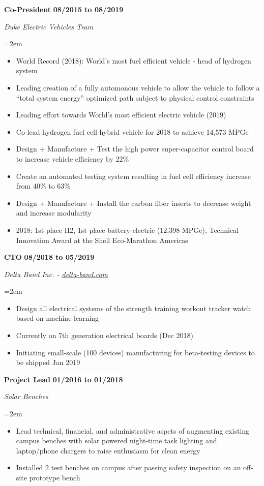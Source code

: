 \documentclass[paper=letter,fontsize=11pt]{scrartcl} %
\newcommand{\sepspace}{\vspace*{1em}}		%
\newcommand{\EducationEntry}[4]{
		\noindent \textbf{#1} \hfill      %
		\colorbox{White}{%
			\bf 
			\parbox{10em}{%
			\hfill\color{Black}#2}} \par  %
		\noindent \textit{#3} \par        %
		\noindent\hangindent=2em\hangafter=0 \small #4 %
		\normalsize \par}
\newcommand{\WorkEntry}[4]{				  %
		\noindent \textbf{#1} \hfill      %
		\colorbox{White}{\bf \color{Black}#2} \par  %
		\noindent \textit{#3} \par              %
		\noindent\hangindent=2em\hangafter=0 \small #4 %
		\normalsize \par}
\begin{document}
\WorkEntry{Co-President}{08/2015 to 08/2019}{Duke Electric Vehicles Team}{
	\begin{itemize}
		\item World Record (2018): World's most fuel efficient vehicle - head of hydrogen system
		\item Leading creation of a fully automonous vehicle to allow the vehicle to follow a ``total system energy'' optimized path subject to physical control constraints
		\item Leading effort towards World's most efficient electric vehicle (2019)
		\item Co-lead hydrogen fuel cell hybrid vehicle for 2018 to achieve 14,573 MPGe
		\item Design + Manufacture + Test the high power super-capacitor control board to increase vehicle efficiency by 22\%
		\item Create an automated testing system resulting in fuel cell efficiency increase from 40\% to 63\%
		\item Design + Manufacture + Install the carbon fiber inserts to decrease weight and increase modularity
		\item 2018: 1st place H2, 1st place battery-electric (12,398 MPGe), Technical Innovation Award at the Shell Eco-Marathon Americas
	\end{itemize}
}
\sepspace
\pagebreak

\WorkEntry{CTO}{08/2018 to 05/2019}{Delta Band Inc. - \href{delta-band.com}{delta-band.com}}{
	\begin{itemize}
		\item Design all electrical systems of the strength training workout tracker watch based on machine learning
		\item Currently on 7th generation electrical boards (Dec 2018)
		\item Initiating small-scale (100 devices) manufacturing for beta-testing devices to be shipped Jan 2019
	\end{itemize}
}
\sepspace

\WorkEntry{Project Lead}{01/2016 to 01/2018}{Solar Benches}{
	\begin{itemize}
		\item Lead technical, financial, and administrative aspcts of augmenting existing campus benches with solar powered night-time task lighting and laptop/phone chargers to raise enthusiasm for clean energy
		\item Installed 2 test benches on campus after passing safety inspection on an off-site prototype bench
	\end{itemize}
}
\end{document}
